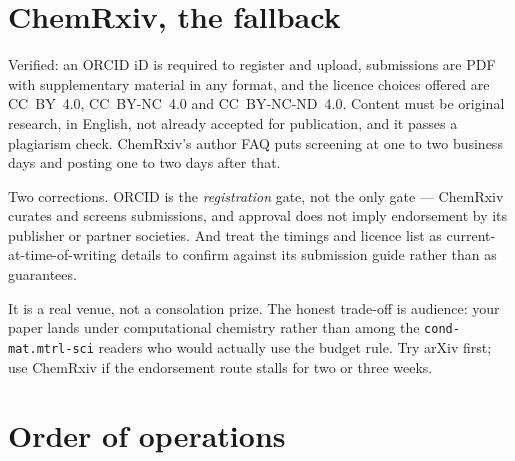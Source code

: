 \documentclass[11pt]{article}
\begin{document}
\section{ChemRxiv, the fallback}

Verified: an ORCID iD is required to register and upload, submissions are PDF with
supplementary material in any format, and the licence choices offered are CC~BY~4.0,
CC~BY-NC~4.0 and CC~BY-NC-ND~4.0. Content must be original research, in English, not already
accepted for publication, and it passes a plagiarism check. ChemRxiv's author FAQ puts
screening at one to two business days and posting one to two days after that.

Two corrections. ORCID is the \emph{registration} gate, not the only gate --- ChemRxiv
curates and screens submissions, and approval does not imply endorsement by its publisher or
partner societies. And treat the timings and licence list as current-at-time-of-writing
details to confirm against its submission guide rather than as guarantees.

It is a real venue, not a consolation prize. The honest trade-off is audience: your paper
lands under computational chemistry rather than among the \texttt{cond-mat.mtrl-sci} readers
who would actually use the budget rule. Try arXiv first; use ChemRxiv if the endorsement
route stalls for two or three weeks.

\section{Order of operations}
\end{document}
